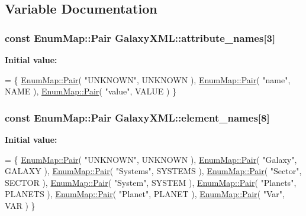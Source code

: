 \subsection{Variable Documentation}
\subsubsection[{\texorpdfstring{attribute\+\_\+names}{attribute_names}}]{\setlength{\rightskip}{0pt plus 5cm}const {\bf Enum\+Map\+::\+Pair} Galaxy\+X\+M\+L\+::attribute\+\_\+names\mbox{[}3\mbox{]}}\hypertarget{namespaceGalaxyXML_a761fbe2b92781a4d5a1220233d96f94d}{}\label{namespaceGalaxyXML_a761fbe2b92781a4d5a1220233d96f94d}
{\bfseries Initial value\+:}
\begin{DoxyCode}
= \{
    \hyperlink{structXMLSupport_1_1EnumMap_1_1Pair}{EnumMap::Pair}( \textcolor{stringliteral}{"UNKNOWN"}, UNKNOWN ),
    \hyperlink{structXMLSupport_1_1EnumMap_1_1Pair}{EnumMap::Pair}( \textcolor{stringliteral}{"name"},    NAME ),
    \hyperlink{structXMLSupport_1_1EnumMap_1_1Pair}{EnumMap::Pair}( \textcolor{stringliteral}{"value"},   VALUE )
\}
\end{DoxyCode}
\subsubsection[{\texorpdfstring{element\+\_\+names}{element_names}}]{\setlength{\rightskip}{0pt plus 5cm}const {\bf Enum\+Map\+::\+Pair} Galaxy\+X\+M\+L\+::element\+\_\+names\mbox{[}8\mbox{]}}\hypertarget{namespaceGalaxyXML_a27768b93eb7d224d795e1b91062346cf}{}\label{namespaceGalaxyXML_a27768b93eb7d224d795e1b91062346cf}
{\bfseries Initial value\+:}
\begin{DoxyCode}
= \{
    \hyperlink{structXMLSupport_1_1EnumMap_1_1Pair}{EnumMap::Pair}( \textcolor{stringliteral}{"UNKNOWN"}, UNKNOWN ),
    \hyperlink{structXMLSupport_1_1EnumMap_1_1Pair}{EnumMap::Pair}( \textcolor{stringliteral}{"Galaxy"},  GALAXY ),
    \hyperlink{structXMLSupport_1_1EnumMap_1_1Pair}{EnumMap::Pair}( \textcolor{stringliteral}{"Systems"}, SYSTEMS ),
    \hyperlink{structXMLSupport_1_1EnumMap_1_1Pair}{EnumMap::Pair}( \textcolor{stringliteral}{"Sector"},  SECTOR ),
    \hyperlink{structXMLSupport_1_1EnumMap_1_1Pair}{EnumMap::Pair}( \textcolor{stringliteral}{"System"},  SYSTEM ),
    \hyperlink{structXMLSupport_1_1EnumMap_1_1Pair}{EnumMap::Pair}( \textcolor{stringliteral}{"Planets"}, PLANETS ),
    \hyperlink{structXMLSupport_1_1EnumMap_1_1Pair}{EnumMap::Pair}( \textcolor{stringliteral}{"Planet"},  PLANET ),
    \hyperlink{structXMLSupport_1_1EnumMap_1_1Pair}{EnumMap::Pair}( \textcolor{stringliteral}{"Var"},     VAR )
\}
\end{DoxyCode}
